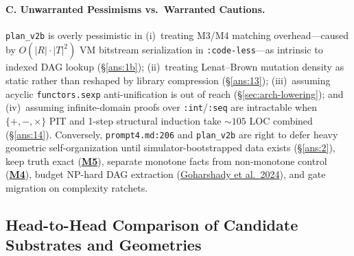 \documentclass[12pt]{article}
\newcommand{\litref}[2]{\hyperlink{lit:#1}{\textcolor{citegreen}{#2}}}
\begin{document}
\paragraph{C. Unwarranted Pessimisms vs.\ Warranted Cautions.}
\texttt{plan\_v2b} is overly pessimistic in (i)~treating M3/M4 matching overhead---caused by $O(|R|\cdot|T|^2)$ VM bitstream serialization in \texttt{:code-less}---as intrinsic to indexed DAG lookup (\S\ref{ans:1b}); (ii)~treating Lenat--Brown mutation density as static rather than reshaped by library compression (\S\ref{ans:13}); (iii)~assuming acyclic \texttt{functors.sexp} anti-unification is out of reach (\S\ref{sec:arch-lowering}); and (iv)~assuming infinite-domain proofs over \texttt{:int}/\texttt{:seq} are intractable when $\{+,-,\times\}$ PIT and 1-step structural induction take $\sim 105$ LOC combined (\S\ref{ans:14}). Conversely, \texttt{prompt4.md:206} and \texttt{plan\_v2b} are right to defer heavy geometric self-organization until simulator-bootstrapped data exists (\S\ref{ans:2}), keep truth exact (\hyperlink{q:m5}{\textbf{M5}}), separate monotone facts from non-monotone control (\hyperlink{q:m4}{\textbf{M4}}), budget NP-hard DAG extraction (\litref{goharshady2024}{Goharshady et al.\ 2024}), and gate migration on complexity ratchets.

\subsection{Head-to-Head Comparison of Candidate Substrates and Geometries}
\label{sec:alternatives-comparison}
\end{document}

